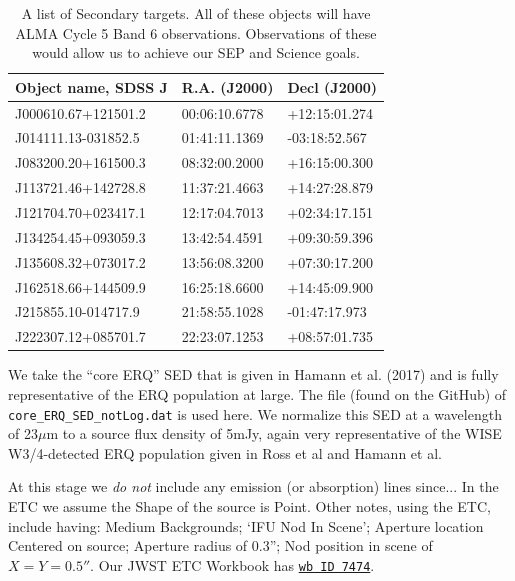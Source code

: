 \footnotesize 
\begin{table}
  \begin{center}
    \footnotesize 
    \begin{tabular}{|| l | l  l ||}
      \hline \hline
      Object name, SDSS J  	& R.A. (J2000) & Decl (J2000) \\
      \hline
      J000610.67+121501.2 &     00:06:10.6778 &+12:15:01.274 \\
      J014111.13-031852.5 &     01:41:11.1369 & -03:18:52.567 \\
      J083200.20+161500.3  & 08:32:00.2000 & +16:15:00.300 \\
      J113721.46+142728.8 &     11:37:21.4663 & +14:27:28.879 \\
      J121704.70+023417.1 & 12:17:04.7013 & +02:34:17.151 \\
      J134254.45+093059.3 &     13:42:54.4591 & +09:30:59.396  \\
      J135608.32+073017.2 & 13:56:08.3200 & +07:30:17.200\\
      J162518.66+144509.9 &     16:25:18.6600 & +14:45:09.900 \\
      J215855.10-014717.9 &     21:58:55.1028& -01:47:17.973 \\
      J222307.12+085701.7 & 22:23:07.1253 & +08:57:01.735\\
      \hline\hline
    \end{tabular}
    \caption{A list of Secondary targets. All of these objects will
      have ALMA Cycle 5 Band 6 observations. Observations of these would
      allow us to achieve our SEP and Science goals.}
\label{tab:backups} 
\end{center}
\end{table}
\smallskip \smallskip 
\noindent
We take the ``core ERQ'' SED that is given in Hamann et al. (2017) and
is fully representative of the ERQ population at large.  The file
(found on the GitHub) of {\tt core\_ERQ\_SED\_notLog.dat} is used
here.  We normalize this SED at a wavelength of 23$\mu$m to a source
flux density of 5mJy, again very representative of the WISE
W3/4-detected ERQ population given in Ross et al and Hamann et al.

\smallskip \smallskip 
\noindent
At this stage we {\it do not} include any emission (or absorption)
lines since...  In the ETC we assume the Shape of the source is Point.
Other notes, using the ETC, include having: Medium Backgrounds; `IFU
Nod In Scene'; Aperture location Centered on source; Aperture radius
of 0.3''; Nod position in scene of $X=Y=0.5''$.  Our JWST ETC Workbook
has \href{https://jwst.etc.stsci.edu/workbook.html?wb_id=7474}{{\tt wb
ID 7474}}.

